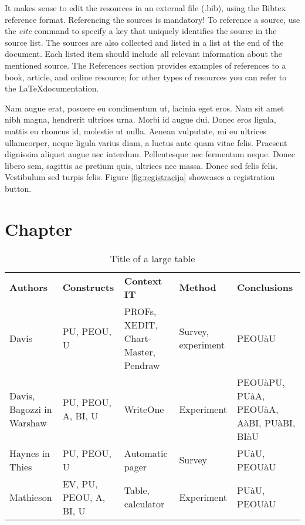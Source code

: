 \documentclass{comjnl}
\begin{document}
It makes sense to edit the resources in an external file (.bib), using the Bibtex reference format. Referencing the sources is mandatory! To reference a source, use the \textit{cite} command to specify a key that uniquely identifies the source in the source list. The sources are also collected and listed in a list at the end of the document. Each listed item should include all relevant information about the mentioned source. The References section provides examples of references to a book, article, and online resource; for other types of resources you can refer to the \LaTeX documentation.

Nam augue erat, posuere eu condimentum ut, lacinia eget eros. Nam sit amet nibh magna, hendrerit ultrices urna. Morbi id augue dui. Donec eros ligula, mattis eu rhoncus id, molestie ut nulla. Aenean vulputate, mi eu ultrices ullamcorper, neque ligula varius diam, a luctus ante quam vitae felis. Praesent dignissim aliquet augue nec interdum. Pellentesque nec fermentum neque. Donec libero sem, sagittis ac pretium quis, ultrices nec massa. Donec sed felis felis. Vestibulum sed turpis felis.
Figure \ref{fig:registracija} showcases a registration button. 


\section{Chapter} 

\begin{table*} %
\captionsetup{justification=raggedright}
\caption{Title of a large table}
\label{tab:sirokatabela}
\begin{tabular}{>{\raggedright\arraybackslash}m{2.7cm}>{\raggedright\arraybackslash}m{3.3cm}>{\raggedright\arraybackslash}m{3.3cm}>{\raggedright\arraybackslash}m{3cm}>{\raggedright\arraybackslash}m{3.3cm}}
\rowcolor[HTML]{656565} 
{\color[HTML]{FFFFFF} \textbf{Authors}} & {\color[HTML]{FFFFFF} \textbf{Constructs}} & {\color[HTML]{FFFFFF} \textbf{Context IT}} & {\color[HTML]{FFFFFF} \textbf{Method}} & {\color[HTML]{FFFFFF} \textbf{Conclusions}} \\ 
Davis & PU, PEOU, U & PROFs, XEDIT, Chart-Master, Pendraw & Survey, experiment &   PEOUàU \\ \hline
Davis, Bagozzi in Warshaw & PU, PEOU, A, BI, U & WriteOne & Experiment & PEOUàPU, PUàA, PEOUàA, AàBI, PUàBI, BIàU \\ \hline
Haynes in Thies & PU, PEOU, U & Automatic pager & Survey & PUàU, PEOUàU \\ \hline
Mathieson & EV, PU, PEOU, A, BI, U & Table, calculator & Experiment & PUàU,   PEOUàU \\ \hline
\end{tabular}
\end{table*}
\end{document}
